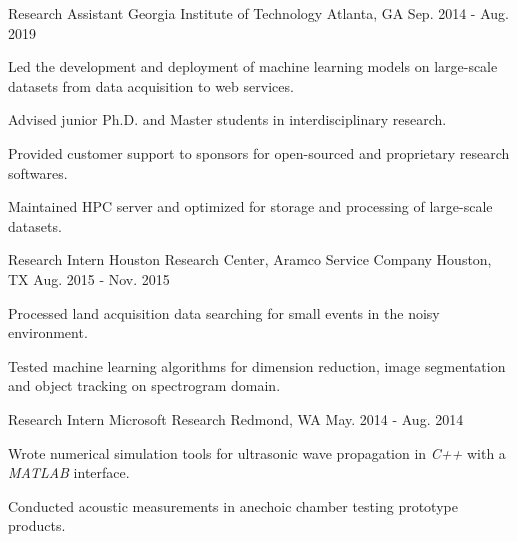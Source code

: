 \begin{cventries}
	\cventry
		{Research Assistant} %
		{Georgia Institute of Technology} %
		{Atlanta, GA} %
		{Sep. 2014 - Aug. 2019} %
		{
			\begin{cvitems} %
				\item {Led the development and deployment of machine learning models on large-scale datasets from data acquisition to web services.}
				\item {Advised junior Ph.D. and Master students in interdisciplinary research.}
				\item {Provided customer support to sponsors for open-sourced and proprietary research softwares.}
				\item {Maintained HPC server and optimized for storage and processing of large-scale datasets.}
			\end{cvitems}
		}


	\cventry
		{Research Intern} %
		{Houston Research Center, Aramco Service Company} %
		{Houston, TX} %
		{Aug. 2015 - Nov. 2015} %
		{
			\begin{cvitems} %
				\item {Processed land acquisition data searching for small events in the noisy environment.}
				\item {Tested machine learning algorithms for dimension reduction, image segmentation and object tracking on spectrogram domain.}
			\end{cvitems}
		}

	\cventry
		{Research Intern} %
		{Microsoft Research} %
		{Redmond, WA} %
		{May. 2014 - Aug. 2014} %
		{
			\begin{cvitems} %
				\item {Wrote numerical simulation tools for ultrasonic wave propagation in \textit{C++} with a \textit{MATLAB} interface.}
				\item {Conducted acoustic measurements in anechoic chamber testing prototype products.}
			\end{cvitems}
		}


\end{cventries}
